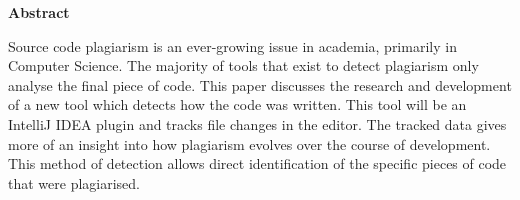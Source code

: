 \thispagestyle{empty}


\begin{center}
    {\LARGE\bf Abstract}
\end{center}

Source code plagiarism is an ever-growing issue in academia, primarily in Computer Science. The majority of tools that exist to detect plagiarism only analyse the final piece of code. This paper discusses the research and development of a new tool which detects how the code was written. This tool will be an IntelliJ IDEA plugin and tracks file changes in the editor. The tracked data gives more of an insight into how plagiarism evolves over the course of development. This method of detection allows direct identification of the specific pieces of code that were plagiarised.

